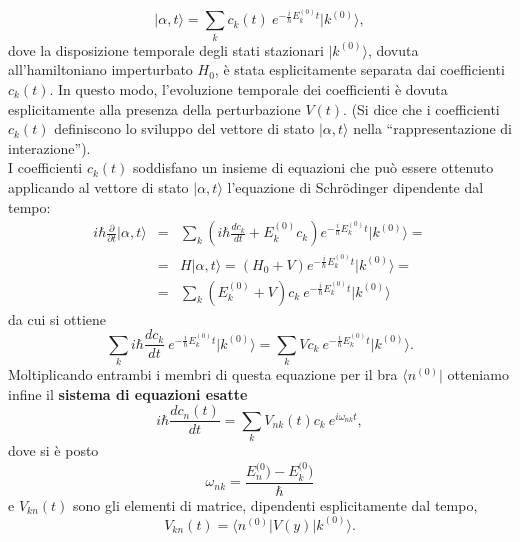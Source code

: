 \documentclass[a4paper,12pt,oneside]{book}
\begin{document}
\begin{equation}
\vert \alpha ,t  \rangle = \sum _k c_k (t)\ e^{-\frac{i}{\hbar}E_k ^{(0)} t } \vert k ^{(0)} \rangle ,
\label{eq:cap15_2}
\end{equation}
dove la disposizione temporale degli stati stazionari $\vert k ^{(0)} \rangle$, dovuta all'hamiltoniano imperturbato $H_0$, è stata esplicitamente separata dai coefficienti $c_k {(t)}$. In questo modo, l'evoluzione temporale dei coefficienti è dovuta esplicitamente alla presenza della perturbazione $V(t)$. (Si dice che i coefficienti $c_k (t)$ definiscono lo sviluppo del vettore di stato $\vert \alpha , t \rangle $ nella ``rappresentazione di interazione'').\\
I coefficienti $c_k (t)$ soddisfano un insieme di equazioni che può essere ottenuto applicando al vettore di stato $\vert \alpha , t \rangle $ l'equazione di Schr\"{o}dinger dipendente dal tempo:
\begin{eqnarray}
i\hbar \frac{\partial}{\partial t} \vert \alpha , t \rangle &=& \sum _ k \left( i\hbar \frac{dc_k}{dt}+ E_k ^{(0)} c_k\right)e^{-\frac{i}{\hbar}E_k ^{(0)} t } \vert k ^{(0)} \rangle = \nonumber \\
& = & H\vert \alpha , t \rangle  = \left( H_0 + V\right)e^{-\frac{i}{\hbar}E_k ^{(0)} t } \vert k ^{(0)} \rangle  =  \nonumber\\
& = &\sum _k \left( E_k ^{(0)}+ V\right)c_k\ e^{-\frac{i}{\hbar}E_k ^{(0)} t } \vert k ^{(0)} \rangle 
\end{eqnarray}
da cui si ottiene
\begin{equation}
\sum _ k i\hbar \frac{dc_k}{dt} \ e^{-\frac{i}{\hbar}E_k ^{(0)} t } \vert k ^{(0)} \rangle = \sum _ k V c_k\ e^{-\frac{i}{\hbar}E_k ^{(0)} t } \vert k ^{(0)} \rangle .
\end{equation}
Moltiplicando entrambi i membri di questa equazione per il bra $\langle n^{(0)} \vert$ otteniamo infine il \textbf{sistema di equazioni esatte}
\begin{equation}
i\hbar \frac{dc_n (t)}{dt} = \sum _ k V_{nk} (t) c_k\ e^{i\omega _{nk}t } ,
\label{eq:cap15_3}
\end{equation}
dove si è posto
\begin{equation}
\omega _{nk} = \frac{E_n ^{(0})-E_k ^{(0})}{\hbar}
\end{equation}
e $V_{kn} (t)$ sono gli elementi di matrice, dipendenti esplicitamente dal tempo,
\begin{equation}
V_{kn} (t) = \langle n ^{(0)} \vert V(y) \vert k ^{(0)} \rangle .
\end{equation}
\end{document}
